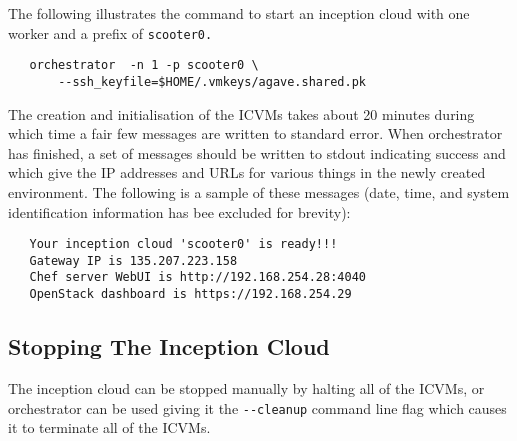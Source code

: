 \dlbeg{0.85in}

\vspace{5pt}

\vspace{5pt}

\vspace{5pt}

\vspace{5pt}
\dlend

\noindent
The following illustrates the command to start an inception cloud with one worker and a prefix of \verb!scooter0.!

\small\begin{verbatim}
   orchestrator  -n 1 -p scooter0 \
       --ssh_keyfile=$HOME/.vmkeys/agave.shared.pk
\end{verbatim}\normalsize
\noindent
The creation and initialisation of the ICVMs takes about 20 minutes during which time a fair few messages
are written to standard error. 
When orchestrator has finished, a set of messages should be written to stdout indicating success and which give the IP 
addresses and URLs for various things in the newly created environment.  
The following is a sample of these messages (date, time, and system identification information has bee excluded for brevity):

\small\begin{verbatim}
   Your inception cloud 'scooter0' is ready!!!
   Gateway IP is 135.207.223.158
   Chef server WebUI is http://192.168.254.28:4040
   OpenStack dashboard is https://192.168.254.29
\end{verbatim}\normalsize

\subsection{Stopping The Inception Cloud}
The inception cloud can be stopped manually by halting all of the ICVMs, or orchestrator can be used
giving it the \verb!--cleanup! command line flag which causes it to terminate all of the ICVMs.

